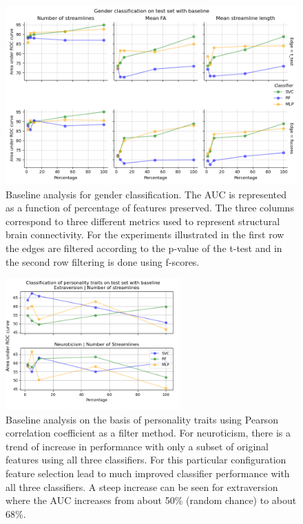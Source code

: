 \documentclass[msthesis.tex]{subfiles}
\begin{document}
\begin{figure}[]
    \centering
    \includegraphics[width=\textwidth, height=0.6\textwidth]{images/baseline_results_gender.png}
    \caption{Baseline analysis for gender classification. The \gls{AUC} is represented as a function of percentage of features preserved. The three columns correspond to three different metrics used to represent structural brain connectivity. For the experiments illustrated in the first row the edges are filtered according to the p-value of the t-test and in the second row filtering is done using f-scores. }
    \label{fig:baselinegender}
\end{figure}
\begin{figure}[]
    \centering
    \includegraphics[height=0.4\textwidth,width=0.6\textwidth,keepaspectratio]{images/persona_2.png}
    \caption{Baseline analysis on the basis of personality traits using Pearson correlation coefficient as a filter method. For neuroticism, there is a trend of increase in performance with only a subset of original features using all three classifiers. For this particular configuration feature selection lead to much improved classifier performance with all three classifiers. A steep increase can be seen for extraversion where the \gls{AUC} increases from about 50\% (random chance) to about 68\%.}
    \label{fig:persona base}
\end{figure}
\end{document}
